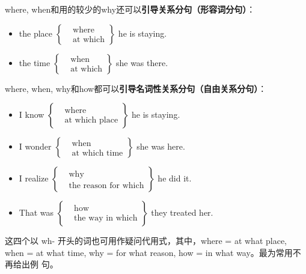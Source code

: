 where, when和用的较少的why还可以\textbf{引导关系分句（形容词分句）}：
\begin{itemize}
\item the place
    $\left\{
      \begin{aligned}
        &\text{where}\\
        &\text{at which}
      \end{aligned}
      \right\} $ he is staying.

\item the time
    $\left\{
      \begin{aligned}
        &\text{when}\\
        &\text{at which}
      \end{aligned}
      \right\} $ she was there.
\end{itemize}

where, when, why和how都可以\textbf{引导名词性关系分句（自由关系分句）}：
\begin{itemize}
\item I know
    $\left\{
      \begin{aligned}
        &\text{where}\\
        &\text{at which place}
      \end{aligned}
      \right\} $ he is staying.

\item I wonder
    $\left\{
      \begin{aligned}
        &\text{when}\\
        &\text{at which time}
      \end{aligned}
      \right\} $ she was here.

\item I realize
    $\left\{
      \begin{aligned}
        &\text{why}\\
        &\text{the reason for which}
      \end{aligned}
      \right\} $ he did it.

\item That was
    $\left\{
      \begin{aligned}
        &\text{how}\\
        &\text{the way in which}
      \end{aligned}
      \right\} $ they treated her.
\end{itemize}

这四个以 wh- 开头的词也可用作疑问代用式，其中，where = at what place, when =
at what time, why = for what reason, how = in what way。最为常用不再给出例
句。

